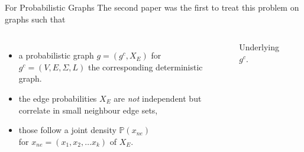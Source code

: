 \documentclass[10pt, aspectratio=149]{beamer}
\begin{document}
\begin{frame}{For Probabilistic Graphs}
    The second paper \cite{sim} was the first to treat this problem on graphs such that
    
    \begin{columns}[T]
    \begin{itemize}
        \item a probabilistic graph $g = (g^c, X_E)$ for $g^c = (V, E, \Sigma, L)$ the corresponding deterministic graph.
        
        \item<2-> the edge probabilities $X_E$ are \textit{not} independent but correlate in small neighbour edge sets,
        
        \item<3-> those follow a joint density $\mathbb{P}(x_{ne})$\\
        for $x_{ne} = (x_1, x_2, \ldots x_k)$ of $X_E$.
    \end{itemize}
    
    \begin{figure}
    \centering
    \caption{Underlying $g^c$.}
    \end{figure}
    
    
    \end{columns}
\end{frame}
\end{document}
